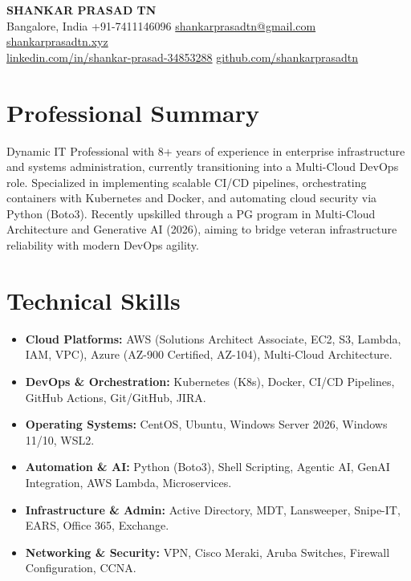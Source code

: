 \documentclass[10pt, a4paper]{article}
\begin{document}
\begin{center}
    {\Huge \textbf{SHANKAR PRASAD TN}} \\
    \vspace{1pt}
    \small
    Bangalore, India \textbullet{} +91-7411146096 \textbullet{} \href{mailto:shankarprasadtn@gmail.com}{shankarprasadtn@gmail.com} \textbullet{} \href{https://shankarprasadtn.xyz}{shankarprasadtn.xyz} \\
    \href{https://linkedin.com/in/shankar-prasad-34853288}{linkedin.com/in/shankar-prasad-34853288} \textbullet{} \href{https://github.com/shankarprasadtn}{github.com/shankarprasadtn}
\end{center}

\section{Professional Summary}
Dynamic IT Professional with 8+ years of experience in enterprise infrastructure and systems administration, currently transitioning into a Multi-Cloud DevOps role. Specialized in implementing scalable CI/CD pipelines, orchestrating containers with Kubernetes and Docker, and automating cloud security via Python (Boto3). Recently upskilled through a PG program in Multi-Cloud Architecture and Generative AI (2026), aiming to bridge veteran infrastructure reliability with modern DevOps agility.

\section{Technical Skills}
\begin{itemize}
    \item \textbf{Cloud Platforms:} AWS (Solutions Architect Associate, EC2, S3, Lambda, IAM, VPC), Azure (AZ-900 Certified, AZ-104), Multi-Cloud Architecture.
    \item \textbf{DevOps \& Orchestration:} Kubernetes (K8s), Docker, CI/CD Pipelines, GitHub Actions, Git/GitHub, JIRA.
    \item \textbf{Operating Systems:} CentOS, Ubuntu, Windows Server 2026, Windows 11/10, WSL2.
    \item \textbf{Automation \& AI:} Python (Boto3), Shell Scripting, Agentic AI, GenAI Integration, AWS Lambda, Microservices.
    \item \textbf{Infrastructure \& Admin:} Active Directory, MDT, Lansweeper, Snipe-IT, EARS, Office 365, Exchange.
    \item \textbf{Networking \& Security:} VPN, Cisco Meraki, Aruba Switches, Firewall Configuration, CCNA.
\end{itemize}
\end{document}
